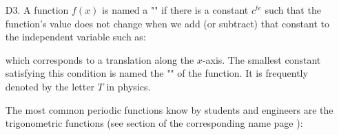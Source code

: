 \begin{enumerate}
		\item[D3.] A function $f(x)$ is named a "" if there is a constant $c^{te}$ such that the function's value does not change when we add (or subtract) that constant to the independent variable such as:
		
		which corresponds to a translation along the $x$-axis. The smallest constant satisfying this condition is named the "" of the function. It is frequently denoted by the letter $T$ in physics.
		
		The most common periodic functions know by students and engineers are the trigonometric functions (see section of the corresponding name page \pageref{trigonometry}):
		\begin{figure}[H]
			\centering
			\begin{tikzpicture}[x=0.75pt,y=0.75pt,yscale=-1,xscale=1]
			

\end{tikzpicture}
\end{figure}
\end{enumerate}
